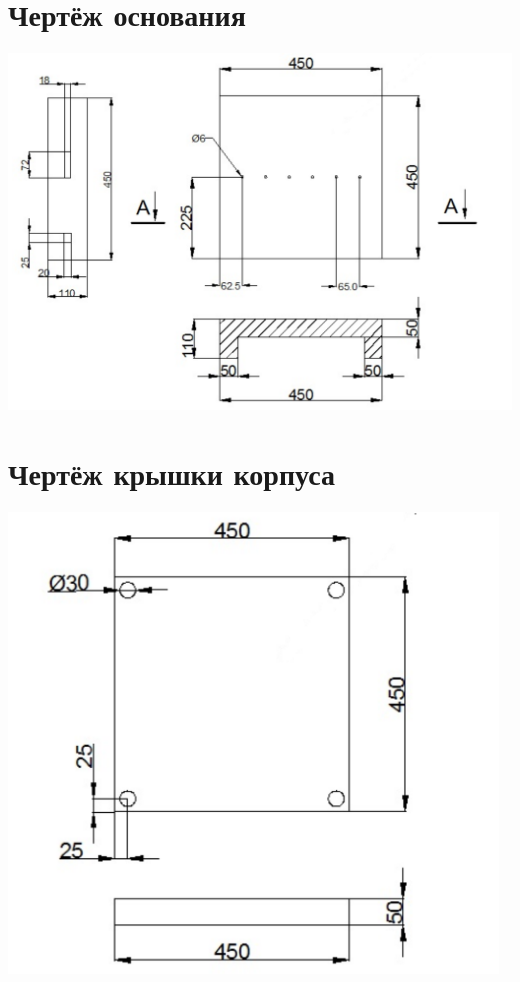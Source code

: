 \chapter{Чертёж основания}
	\begin{center}
		\includegraphics[width=180mm]{src/pictures/drawingp1.png}
	\end{center}
\chapter{Чертёж крышки корпуса}
	\begin{center}
		\includegraphics[width=130mm]{src/pictures/drawingp2.png}
	\end{center}
